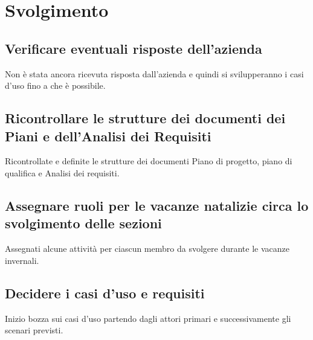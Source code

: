 \newpage
\section*{Svolgimento}

	\subsection*{Verificare eventuali risposte dell'azienda}
		Non è stata ancora ricevuta risposta dall'azienda e quindi si svilupperanno i casi d'uso fino a che è possibile.
	\subsection*{Ricontrollare le strutture dei documenti dei Piani e dell'Analisi dei Requisiti}
		Ricontrollate e definite le strutture dei documenti Piano di progetto, piano di qualifica e Analisi dei requisiti.
	\subsection*{Assegnare ruoli per le vacanze natalizie circa lo svolgimento delle sezioni}
		Assegnati alcune attività per ciascun membro da svolgere durante le vacanze invernali.
	\subsection*{Decidere i casi d'uso e requisiti}
		Inizio bozza sui casi d'uso partendo dagli attori primari e successivamente gli scenari previsti.